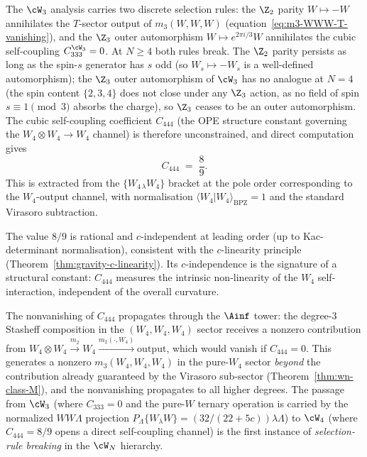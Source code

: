 \begin{computation}
\label{comp:w4-cubic-self-coupling}%
%
%
%
The $\cW_3$ analysis carries two discrete selection rules:
the $\Z_2$ parity $W \mapsto -W$ annihilates the $T$-sector
output of $m_3(W,W,W)$ (equation~\eqref{eq:m3-WWW-T-vanishing}),
and the $\Z_3$ outer automorphism $W \mapsto e^{2\pi i/3}W$
annihilates the cubic self-coupling $C_{333}^{\cW_3} = 0$.
At $N \ge 4$ both rules break. The $\Z_2$ parity
persists as long as the spin-$s$ generator has $s$ odd
(so $W_s \mapsto -W_s$ is a well-defined automorphism);
the $\Z_3$ outer automorphism of $\cW_3$ has no analogue at
$N = 4$ (the spin content $\{2, 3, 4\}$ does not close under
any $\Z_3$ action, as no field of spin $s \equiv 1 \pmod{3}$
absorbs the charge), so $\Z_3$ ceases to be an outer
automorphism. The cubic self-coupling coefficient $C_{444}$
(the OPE structure constant governing the
$W_4 \otimes W_4 \to W_4$ channel) is therefore unconstrained,
and direct computation gives
\begin{equation}\label{eq:C444-value}
C_{444}
\;=\;
\frac{8}{9}.
\end{equation}
This is extracted from the $\{W_{4\,\lambda} W_4\}$ bracket
at the pole order corresponding to the $W_4$-output channel,
with normalisation $\langle W_4 | W_4 \rangle_{\mathrm{BPZ}} = 1$
and the standard Virasoro subtraction.

The value $8/9$ is rational and $c$-independent at leading order
(up to Kac-determinant normalisation), consistent with the
$c$-linearity principle
(Theorem~\ref{thm:gravity-c-linearity}). Its
$c$-independence is the signature of a structural constant:
$C_{444}$ measures the intrinsic non-linearity of the $W_4$
self-interaction, independent of the overall curvature.

The nonvanishing of $C_{444}$ propagates through the $\Ainf$
tower: the degree-$3$ Stasheff composition in the
$(W_4, W_4, W_4)$ sector receives a nonzero contribution from
$W_4 \otimes W_4 \xrightarrow{m_2}
W_4 \xrightarrow{m_2(\cdot, W_4)} \mathrm{output}$, which
would vanish if $C_{444} = 0$. This generates a nonzero
$m_3(W_4, W_4, W_4)$ in the pure-$W_4$ sector \emph{beyond}
the contribution already guaranteed by the Virasoro
sub-sector (Theorem~\ref{thm:wn-class-M}), and the
nonvanishing propagates to all higher degrees. The passage
from $\cW_3$ (where $C_{333} = 0$ and the pure-$W$ ternary
operation is carried by the normalized
\(WW\Lambda\) projection
\(P_\Lambda\{W_\lambda W\}=(32/(22+5c))\lambda\Lambda\)) to
$\cW_4$ (where $C_{444} = 8/9$ opens a direct self-coupling
channel) is the first instance of \emph{selection-rule
breaking} in the $\cW_N$ hierarchy.
\end{computation}

